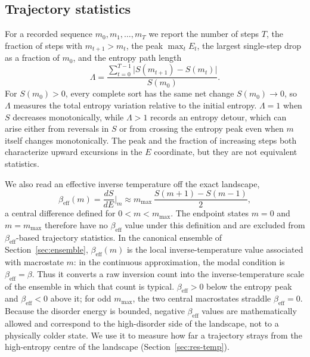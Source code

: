 \documentclass[10pt,journal]{IEEEtran}
\newcommand{\mmax}{m_{\max}}
\begin{document}
\subsection{Trajectory statistics}
For a recorded sequence $m_0,m_1,\dots,m_T$ we report the number of steps $T$, the fraction of steps with $m_{t+1}>m_t$, the peak $\max_t E_t$, the largest single-step drop as a fraction of $m_0$, and the entropy path length
\begin{equation}
\Lambda=\frac{\sum_{t=0}^{T-1}\bigl|S(m_{t+1})-S(m_t)\bigr|}{S(m_0)}.
\label{eq:Lambda}
\end{equation}
For $S(m_0)>0$, every complete sort has the same net change $S(m_0)\to 0$, so $\Lambda$ measures the total entropy variation relative to the initial entropy. $\Lambda=1$ when $S$ decreases monotonically, while $\Lambda>1$ records an entropy detour, which can arise either from reversals in $S$ or from crossing the entropy peak even when $m$ itself changes monotonically. The peak and the fraction of increasing steps both characterize upward excursions in the $E$ coordinate, but they are not equivalent statistics.

We also read an effective inverse temperature off the exact landscape,
\begin{equation}
\beta_{\mathrm{eff}}(m)=\frac{dS}{dE}\bigg|_m \approx \mmax\,\frac{S(m+1)-S(m-1)}{2},
\label{eq:betaeff}
\end{equation}
a central difference defined for $0<m<\mmax$. The endpoint states $m=0$ and $m=\mmax$ therefore have no $\beta_{\mathrm{eff}}$ value under this definition and are excluded from $\beta_{\mathrm{eff}}$-based trajectory statistics. In the canonical ensemble of Section~\ref{sec:ensemble}, $\beta_{\mathrm{eff}}(m)$ is the local inverse-temperature value associated with macrostate $m$: in the continuous approximation, the modal condition is $\beta_{\mathrm{eff}}=\beta$. Thus it converts a raw inversion count into the inverse-temperature scale of the ensemble in which that count is typical. $\beta_{\mathrm{eff}}>0$ below the entropy peak and $\beta_{\mathrm{eff}}<0$ above it; for odd $\mmax$, the two central macrostates straddle $\beta_{\mathrm{eff}}=0$. Because the disorder energy is bounded, negative $\beta_{\mathrm{eff}}$ values are mathematically allowed and correspond to the high-disorder side of the landscape, not to a physically colder state. We use it to measure how far a trajectory strays from the high-entropy centre of the landscape (Section~\ref{sec:res-temp}).
\end{document}

